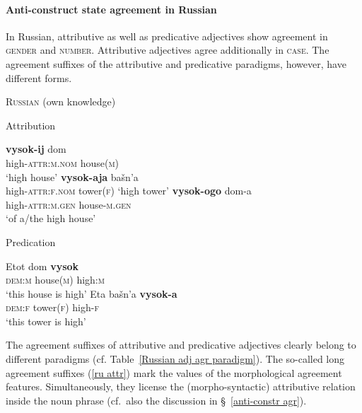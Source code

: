 \paragraph{Anti-construct state agreement in Russian} \label{russian synchr}
In Russian, attributive as well as predicative adjectives show agreement in \textsc{gender} and \textsc{number}. Attributive adjectives agree additionally in \textsc{case}. The agreement suffixes of the attributive and predicative paradigms, however, have different forms.
\begin{exe}
\ex \textsc{Russian} (own knowledge)\label{ru agr}
\begin{xlist}
\ex	Attribution \label{ru attr}
\begin{xlist}
\ex
\gll 	\textbf{vysok-ij} 		dom\\
	high-\textsc{attr:m.nom} house(\textsc{m})\\
\glt	 ‘high house’
\ex \textbf{vysok-aja}	bašn'a\\
	high-\textsc{attr:f.nom} 	tower(\textsc{f})
\glt	‘high tower’
\ex	
\gll	\textbf{vysok-ogo}	dom-a\\
	high-\textsc{attr:m.gen}	house-\textsc{m.gen}\\
\glt	‘of a/the high house’
\end{xlist}
\ex	Predication
\begin{xlist}
\ex
\gll 	Etot 	dom	\textbf{vysok}\\
	\textsc{dem:m} house(\textsc{m}) 	high:\textsc{m}\\
\glt	 ‘this house is high’
\ex	
\gll	Eta 	bašn'a	\textbf{vysok-a}\\
	\textsc{dem:f} tower(\textsc{f}) 	high-\textsc{f}\\
\glt	‘this tower is high’
\end{xlist}
\end{xlist}
\end{exe}
The agreement suffixes of attributive and predicative adjectives clearly belong to different paradigms (cf. Table~\ref{Russian adj agr paradigm}). The so-called long agreement suffixes (\ref{ru attr}) mark the values of the morphological agreement features. Simultaneously, they license the (morpho-syntactic) attributive relation inside the noun phrase (cf.~also the discussion in \S~\ref{anti-constr agr}). 

